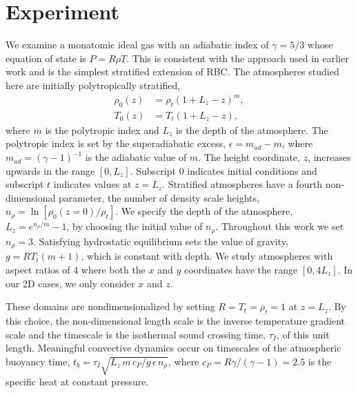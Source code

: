\documentclass[aps, pre, onecolumn, nofootinbib, notitlepage, groupedaddress, amsfonts, amssymb, amsmath, longbibliography]{revtex4-1}
\begin{document}
\section{Experiment} 
\label{sec:experiment}
We examine a monatomic ideal gas with an adiabatic index of
$\gamma = 5/3$ whose equation of state is $P = R\rho T$. This is consistent with the approach used in earlier work 
\cite{graham1975, chan&all1982, brandenburg&all2005,
hurlburt&all1984, cattaneo&all1990, cattaneo&all1991, brummell&all1996} 
and is the simplest stratified extension of RBC.
The atmospheres studied here are initially polytropically stratified,
\begin{equation}
\begin{split}
\rho_0(z) &= \rho_{t}(1 + L_z - z)^m, \\
T_0(z)    &= T_{t}(1 + L_z - z),
\label{eqn:polytrope}
\end{split}
\end{equation}
where $m$ is the polytropic index and $L_z$ is the depth of the atmosphere.
The polytropic
index is set by the superadiabatic excess, $\epsilon = m_{ad} - m$, where
$m_{ad} = (\gamma - 1)^{-1}$ is the adiabatic value of $m$.
The height coordinate, $z$, increases upwards in the range $[0, L_z]$.
Subscript 0 indicates initial conditions and subscript $t$ indicates values
at $z = L_z$.   Stratified atmospheres have a fourth non-dimensional parameter,
the number of density scale heights, $n_{\rho} = \ln\left[\rho_0(z=0)/\rho_t\right]$.  We
specify the depth of the atmosphere, $L_z = e^{n_{\rho}/m} - 1$, by choosing
the initial value of $n_{\rho}$.
Throughout this work we set $n_{\rho} = 3$.    Satisfying hydrostatic
equilibrium sets the value of gravity, $g = RT_t (m + 1)$, which is
constant with depth.  We study atmospheres with aspect
ratios of 4 where both the $x$ and $y$ coordinates have the range $[0, 4L_z]$.
In our 2D cases, we only consider $x$ and $z$.

These domains are nondimensionalized by setting
$R = T_t = \rho_t = 1$ at $z = L_z$.
By this choice, the non-dimensional
length scale is the inverse temperature gradient scale and the 
timescale is the isothermal sound crossing time, 
$\tau_I$, of this unit length.
Meaningful convective dynamics occur on 
timescales of the atmospheric buoyancy time,
$t_b = \tau_I \sqrt{L_z\,m\,c_P/g\,\epsilon\,n_\rho}$, where
$c_P = R \gamma/(\gamma-1) = 2.5$ is the specific heat at constant pressure.
\end{document}
